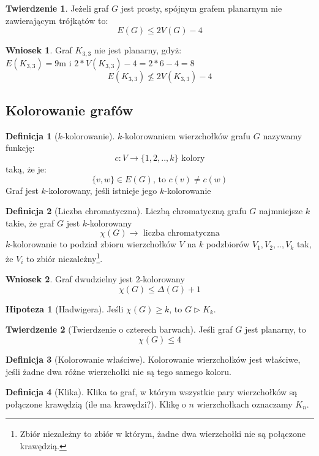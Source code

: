 \documentclass[a4paper,12pt]{article}
\theoremstyle{definition}%
\newtheorem{remark}{Wniosek}%
\newtheorem{theorem}{Twierdzenie}%
\theoremstyle{definition}
\newtheorem{definition}{Definicja}%
\newtheorem{hipoterm}{Hipoteza}%
\theoremstyle{problem}
\begin{document}
\begin{theorem}
Jeżeli graf $G$ jest prosty, spójnym grafem planarnym nie zawierającym trójkątów to:
$$E(G) \leq 2 V(G) - 4$$
\end{theorem}
\begin{remark}
Graf $K_{3,3}$ nie jest planarny, gdyż: \\
$E(K_{3,3})= 9$m i $2*V(K_{3,3})-4=2*6-4=8$
$$E(K_{3,3})\not \leq 2V(K_{3,3})-4$$
\end{remark}

\subsection{Kolorowanie grafów}
\begin{definition}[$k$-kolorowanie] 
$k$-kolorowaniem wierzchołków grafu $G$ nazywamy funkcję: 
$$c: V\rightarrow\{1,2,..,k\} \text{ kolory}$$
taką, że je:
$$\{v,w\}\in E(G)\text{, to } c(v)\neq c(w)$$
Graf jest $k$-kolorowany, jeśli istnieje jego $k$-kolorowanie
\end{definition}

\begin{definition}[Liczba chromatyczna]
Liczbą chromatyczną grafu $G$ najmniejsze $k$ takie, że graf $G$ jest $k$-kolorowany
$$\chi (G)\rightarrow\text{ liczba chromatyczna}$$
$k$-kolorowanie to podział zbioru wierzchołków $V$ na $k$ podzbiorów $V_1, V_2,..,V_k$ tak, że $V_i$ to zbiór niezależny\footnote{Zbiór niezależny to zbiór w którym, żadne dwa wierzchołki nie są połączone krawędzią.}.
\end{definition}
\begin{remark}
Graf dwudzielny jest $2$-kolorowany
$$\chi (G) \leq \Delta (G)+1$$
\end{remark}

\begin{hipoterm}[Hadwigera]
Jeśli $\chi (G)\geq k$, to $G\triangleright K_k$.
\end{hipoterm}

\begin{theorem}[Twierdzenie o czterech barwach]\label{the:4barwy} 
Jeśli graf $G$ jest planarny, to $$\chi (G) \leq 4$$
\end{theorem}

\begin{definition}[Kolorowanie właściwe]
Kolorowanie wierzchołków jest właściwe, jeśli żadne dwa różne wierzchołki nie są tego samego koloru.
\end{definition}

\begin{definition}[Klika] 
Klika to graf, w którym wszystkie pary wierzchołków są połączone krawędzią (ile ma krawędzi?). Klikę o $n$ wierzchołkach oznaczamy $K_n$.
\end{definition}

\end{document}

